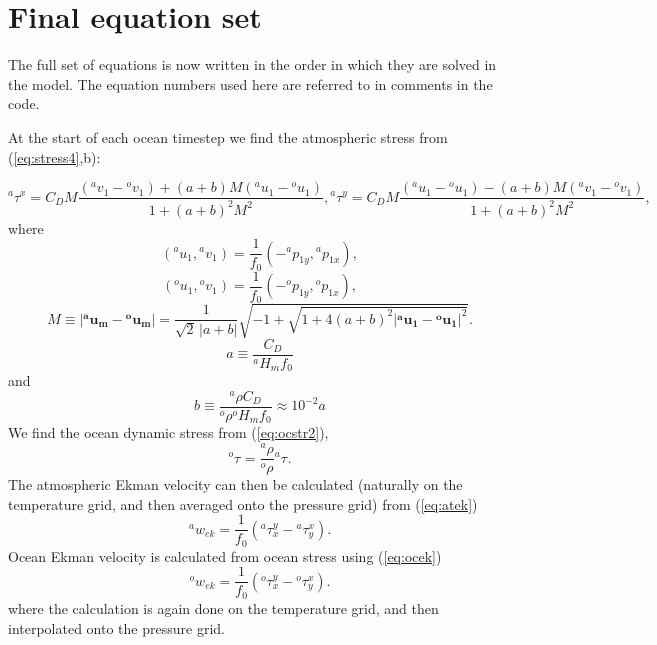 \documentclass[11pt, a4paper,twoside]{article}
\newcommand{\rhb}[1]{{{}^{#1}\rho}}
\newcommand{\p}[2]{{{}^{#1}p_{#2}}}
\newcommand{\uu}[2]{{{}^{#1}u_{#2}}}
\newcommand{\vv}[2]{{{}^{#1}v_{#2}}}
\newcommand{\ek}[1]{{{}^{#1}w_{ek}}}
\newcommand{\HH}[2]{{{}^{#1}H_{#2}}}
\newcommand{\tx}[2]{{}^{#1}\tau^{#2}}
\newcommand{\vc}[1]{\mathbf{#1}}
\numberwithin{equation}{section}
\begin{document}
\section{Final equation set}
The full set of equations is now written in the order in which they are solved in the model.
The equation numbers used here are referred to in comments in the code.


At the start of each ocean timestep we find the atmospheric stress from (\ref{eq:stress4},b):

\begin{subequations}
\begin{equation}\label{eq:stress5}
\tx{a}{x}  =  C_D M \frac{(\vv{a}{1} - \vv{o}{1}) + (a + b) M (\uu{a}{1} - \uu{o}{1}) }{1 +  (a + b)^2 M^2},
\end{equation}
\begin{equation}\label{eq:veldif5}
\tx{a}{y} =  C_D M \frac{(\uu{a}{1} - \uu{o}{1}) - (a + b) M  (\vv{a}{1} - \vv{o}{1})} {1 +  (a + b)^2 M^2},
\end{equation}
\end{subequations}
where
\begin{equation}
( \uu{a}{1}, \vv{a}{1}) = \frac{1}{f_0} \left( - \p{a}{1y} ,\p{a}{1x}\right),
\end{equation}
\begin{equation}
( \uu{o}{1}, \vv{o}{1}) = \frac{1}{f_0} \left( - \p{o}{1y} ,\p{o}{1x}\right),
\end{equation}
\begin{equation}
M \equiv \lvert \vc{\uu{a}{m}} - \vc{\uu{o}{m}} \rvert = \frac{1 }{\sqrt{2}\, \lvert a +b \rvert} \sqrt{-1 +\sqrt{1 + 4 (a+b)^2 \lvert \vc{\uu{a}{1}} - \vc{\uu{o}{1}} \rvert ^2}}.
\end{equation}
\[a \equiv \frac{C_D}{\HH{a}{m}f_0}\]
and
\[b \equiv \frac{\rhb{a}C_D}{\rhb{o}\HH{o}{m}f_0} \approx 10^{-2}a\]
We find the ocean dynamic stress from (\ref{eq:ocstr2}), 
\begin{equation}\label{eq:ocstr1}
\tx{o}{} = \frac{\rhb{a}}{\rhb{o}}\tx{a}{}.
\end{equation}
The atmospheric Ekman velocity can then be calculated (naturally on the temperature grid, and then averaged onto the pressure grid) from (\ref{eq:atek}) 
\begin{equation}\label{eq:atek1}
\ek{a} = \frac{1}{f_0}(\tx{a}{y}_x  - \tx{a}{x}_y).
\end{equation}
Ocean Ekman velocity is calculated from ocean stress using (\ref{eq:ocek})
\begin{equation}\label{eq:ocek1}
\ek{o} = \frac{1}{f_0}(\tx{o}{y}_x  - \tx{o}{x}_y).
\end{equation}
where the calculation is again done on the temperature grid, and then interpolated onto the pressure grid.
\end{document}
